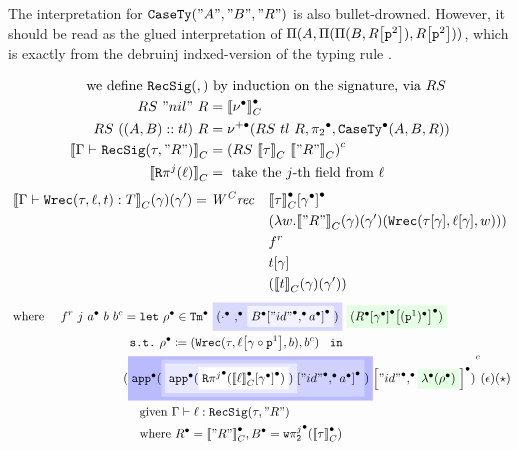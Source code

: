 The interpretation for $\texttt{CaseTy}({"A"},{"B"},{"R"})$ is also bullet-drowned. However, it should be read as the glued interpretation of $ \Pi({A},{\Pi({\Pi({B},{{R}\!\left[{\texttt{p}^{2}}\right]})},{{R}\!\left[{\texttt{p}^{2}}\right]})}) $, which is exactly from the debruinj indxed-version of the typing rule . 


\begin{align*}
  \text{we define } \texttt{RecSig}({},{}) &\text{ by induction on the signature, via } RS \\
  RS~"nil"~R &= {\llbracket {\ensuremath{\nu^\bullet}} \rrbracket}_C^\bullet \\
  RS~((A, B) :: tl)~R &= \nu^{+\bullet}({RS~tl~R},{{\pi_2}^\bullet},{\texttt{CaseTy}^\bullet({A},{B},{R})}) \\ 
  {\llbracket {\ensuremath{ {\Gamma} \vdash_{} {\texttt{RecSig}({\tau},{"R"})} }} \rrbracket}_C &= {({RS~{\llbracket {\tau} \rrbracket}_C~{\llbracket {"R"} \rrbracket}_C})}^c \\
  {\llbracket {\ensuremath{\texttt{R}\pi^{j}({\ell})}} \rrbracket}_C &= \text{ take the $j$-th field from } \ell 
\end{align*}
\begin{align*}
  {\llbracket {\ensuremath{ {\Gamma} \vdash {\ensuremath{\texttt{Wrec}({\tau},{\ell},{t})}} : {T} }} \rrbracket}_C(\gamma)(\gamma') = \mathit{W^Crec} \quad &{{\llbracket {\ensuremath{\tau}} \rrbracket}_C^\bullet}\!\left[{{\gamma}^\bullet}\right]^\bullet \\ 
  & (\lambda w. {\llbracket {"R"} \rrbracket}_C(\gamma)(\gamma')(\texttt{Wrec}({{\tau}\!\left[{\gamma}\right]},{{\ell}\!\left[{\gamma}\right]},{w})))\\
  &f^r\\ &{t}\!\left[{\gamma}\right]\\ 
  &({\llbracket {t} \rrbracket}_C(\gamma)(\gamma')) 
\end{align*}
\begin{align*}  
  \text{ where } \quad f^r~j~\Glued{a}~b~b^c &= 
  \texttt{let}~\Glued{\rho}  \in \GTm{
    \colorbox{blue!15}{(\Glued{\cdot} \Glued{,} \colorbox{blue!5}{\Gsub{\Glued{B}}{\GSubstExt{\Glued{"id"}}{\Glued{a}}}})}
    }{
      \colorbox{green!10}{(\Gsub{\Gsub{\Glued{R}}{\Glued{\gm}}}{\GSubstWeak{1}})}
    } 
  \\
  &\texttt{ s.t.}~\Glued{\rho} \coloneq (\Wrec{\wsig}{\sub{\lkg}{\SubstComp{\gm}{\SubstWeak{1}}}}{b},b^c)~\texttt{ in } \\
  & \Gmodel{
    \Gsub{
      \colorbox{blue!27}{\Gapp{
        \colorbox{blue!18}{\Gsub{
          \colorbox{blue!9}{\Gapp{
            \colorbox{blue!0}{\GRecproj{j}{\Gsub{\denotesCC{\lkg}}{\Glued{\gm}}}}
            }}
          }{
            \GSubstExt{\GSubstId}{\Glued{a}}
          }}}}
      }{
        \GSubstExt{\GSubstId}{
          \colorbox{green!10}{\Glam{\Glued{\rho}}}
          }
      }
    }(\epsilon)(\star) \\
  & \quad 
   \text{ given } \goodTerm{\Gm}{\lkg}{\RecSig{\wsig}{"R"}} \\
   & \quad \text{ where }\Glued{R} = \denotesCC{"R"}, \Glued{B} = \Gwsigproj{j}{2}{\denotesCC{\wsig}}
\end{align*}

